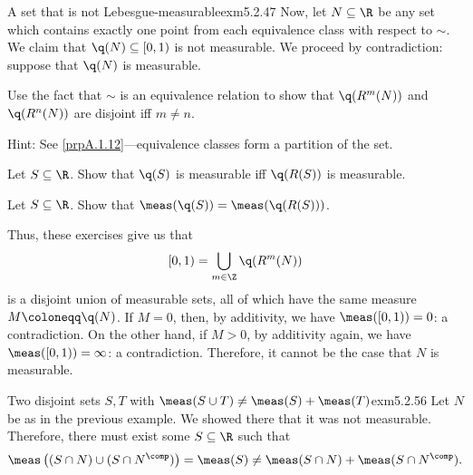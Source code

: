 \begin{exm}{A set that is not Lebesgue-measurable}{exm5.2.47}
Now, let $N\subseteq \R$ be any set which contains exactly one point from each equivalence class with respect to $\sim$.  We claim that $\q (N)\subseteq [0,1)$ is not measurable.  We proceed by contradiction:  suppose that $\q (N)$ is measurable.
\begin{exr}[breakable=false]{}{}
Use the fact that $\sim$ is an equivalence relation to show that $\q (R^m(N))$ and $\q (R^n(N))$ are disjoint iff $m\neq n$.
\begin{rmk}
Hint:  See \cref{prpA.1.12}---equivalence classes form a partition of the set.
\end{rmk}
\end{exr}
\begin{exr}[breakable=false]{}{}
Show that
\begin{equation}
[0,1)=\bigcup _{m\in \Z}\q (R^m(N))
\end{equation}
\begin{rmk}
Hint:  Once again, uses the fact that equivalence classes form a partition.
\end{rmk}
\end{exr}
\begin{exr}[breakable=false]{}{}
Let $S\subseteq \R$.  Show that $\q (S)$ is measurable iff $\q (R(S))$ is measurable.
\end{exr}
\begin{exr}[breakable=false]{}{}
Let $S\subseteq \R$.  Show that $\meas (\q (S))=\meas (\q (R(S)))$.
\end{exr}
Thus, these exercises give us that
\begin{equation}
[0,1)=\bigcup _{m\in \Z}\q (R^m(N))
\end{equation}
is a disjoint union of measurable sets, all of which have the same measure $M\coloneqq \q (N)$.  If $M=0$, then, by additivity, we have $\meas ([0,1))=0$:  a contradiction.  On the other hand, if $M>0$, by additivity again, we have $\meas ([0,1))=\infty$:  a contradiction.  Therefore, it cannot be the case that $N$ is measurable.
\end{exm}
\begin{exm}{Two disjoint sets $S,T$ with $\meas (S\cup T)\neq \meas (S)+\meas (T)$}{exm5.2.56}
Let $N$ be as in the previous example.  We showed there that it was not measurable.  Therefore, there must exist some $S\subseteq \R$ such that
\begin{equation}
\meas \left( (S\cap N)\cup (S\cap N^{\comp})\right) =\meas (S)\neq \meas (S\cap N)+\meas (S\cap N^{\comp}).
\end{equation}
\end{exm}
